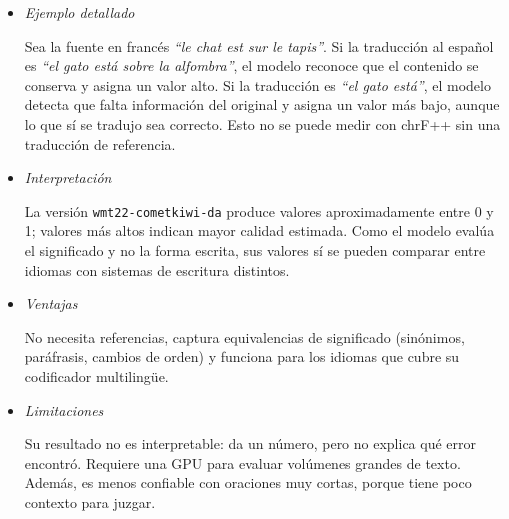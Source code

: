 \begin{itemize}
\begin{equation}
\mathcal{L} = \frac{1}{M}\sum_{i=1}^{M}\left(\hat{y}_i - y_i\right)^2
\end{equation}
 
donde $M$ es el número de pares de entrenamiento.
 
\item \textit{Ejemplo detallado} \\
\vspace{-0.5cm}
 
Sea la fuente en francés \textit{``le chat est sur le tapis''}. Si la traducción al español es \textit{``el gato está sobre la alfombra''}, el modelo reconoce que el contenido se conserva y asigna un valor alto. Si la traducción es \textit{``el gato está''}, el modelo detecta que falta información del original y asigna un valor más bajo, aunque lo que sí se tradujo sea correcto. Esto no se puede medir con chrF++ sin una traducción de referencia.
 
\item \textit{Interpretación} \\
\vspace{-0.5cm}
 
La versión \texttt{wmt22-cometkiwi-da} produce valores aproximadamente entre 0 y 1; valores más altos indican mayor calidad estimada. Como el modelo evalúa el significado y no la forma escrita, sus valores sí se pueden comparar entre idiomas con sistemas de escritura distintos.
 
\item \textit{Ventajas} \\
\vspace{-0.5cm}
 
No necesita referencias, captura equivalencias de significado (sinónimos, paráfrasis, cambios de orden) y funciona para los idiomas que cubre su codificador multilingüe.
 
\item \textit{Limitaciones} \\
\vspace{-0.5cm}
 
Su resultado no es interpretable: da un número, pero no explica qué error encontró. Requiere una GPU para evaluar volúmenes grandes de texto. Además, es menos confiable con oraciones muy cortas, porque tiene poco contexto para juzgar.

\end{itemize}
